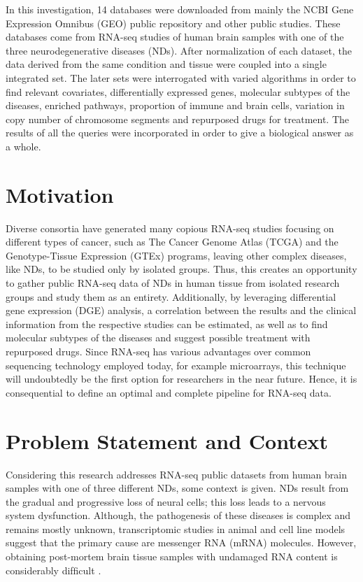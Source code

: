 In this investigation, 14 databases were downloaded from mainly the NCBI Gene Expression Omnibus (GEO) public repository \cite{GEO} and other public studies. These databases come from RNA-seq studies of human brain samples with one of the three neurodegenerative diseases (NDs). After normalization of each dataset, the data derived from the same condition and tissue were coupled into a single integrated set. The later sets were interrogated with varied algorithms in order to find relevant covariates, differentially expressed genes, molecular subtypes of the diseases, enriched pathways, proportion of immune and brain cells, variation in copy number of chromosome segments and repurposed drugs for treatment. The results of all the queries were incorporated in order to give a biological answer as a whole.

\section{Motivation}
Diverse consortia have generated many copious RNA-seq studies focusing on different types of cancer, such as The Cancer Genome Atlas (TCGA) and the Genotype-Tissue Expression (GTEx) programs, leaving other complex diseases, like NDs, to be studied only by isolated groups. Thus, this creates an opportunity to gather public RNA-seq data of NDs in human tissue from isolated research groups and study them as an entirety. Additionally, by leveraging differential gene expression (DGE) analysis, a correlation between the results and the clinical information from the respective studies can be estimated, as well as to find molecular subtypes of the diseases and suggest possible treatment with repurposed drugs. Since RNA-seq has various advantages over common sequencing technology employed today, for example microarrays, this technique will undoubtedly be the first option for researchers in the near future. Hence, it is consequential to define an optimal and complete pipeline for RNA-seq data.

\section{Problem Statement and Context}
Considering this research addresses RNA-seq public datasets from human brain samples with one of three different NDs, some context is given. NDs result from the gradual and progressive loss of neural cells; this loss leads to a nervous system dysfunction. Although, the pathogenesis of these diseases is complex and remains mostly unknown, transcriptomic studies in animal and cell line models suggest that the primary cause are messenger RNA (mRNA) molecules. However, obtaining post-mortem brain tissue samples with undamaged RNA content is considerably difﬁcult \cite{Costa}.

